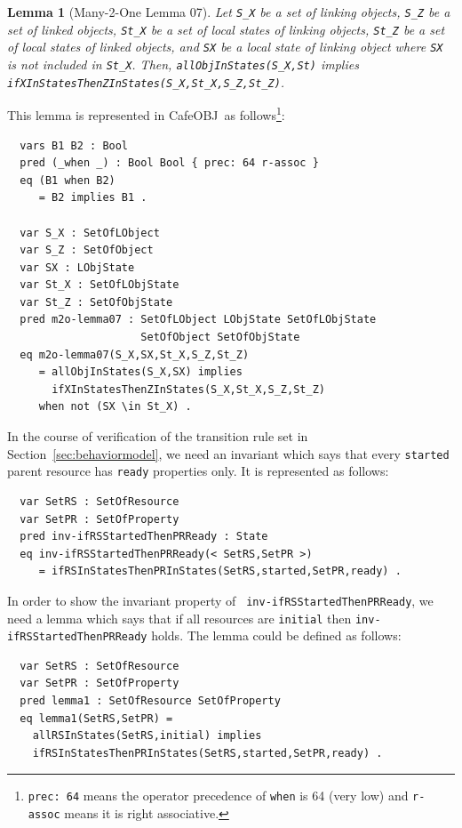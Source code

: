 \documentclass[12pt]{report}
\newtheorem{lemma}{Lemma}
\newcommand{\stt}[1]{{\small{\tt {#1}}}}
\newcommand{\cafeobj}{{\sf CafeOBJ}~}
\begin{document}
\begin{lemma}[Many-2-One Lemma 07]
  Let {\tt S\_X} be a set of linking objects, {\tt S\_Z} be a set of
  linked objects, {\tt St\_X} be a set of local states of linking
  objects, {\tt St\_Z} be a set of local states of linked objects, and
  {\tt SX} be a local state of linking object where {\tt SX} is not
  included in {\tt St\_X}. Then, \stt{allObjInStates(S\_X,St)} implies
  \stt{ifXInStatesThenZInStates(S\_X,St\_X,S\_Z,St\_Z)}.
\end{lemma}
This lemma is represented in \cafeobj as follows\footnote{\stt{prec:~64} 
means the operator precedence of {\tt when} is 64 (very low) and 
{\tt r-assoc} means it is right associative.}:
\small
\begin{verbatim}
  vars B1 B2 : Bool
  pred (_when _) : Bool Bool { prec: 64 r-assoc }
  eq (B1 when B2)
     = B2 implies B1 .

  var S_X : SetOfLObject
  var S_Z : SetOfObject
  var SX : LObjState
  var St_X : SetOfLObjState
  var St_Z : SetOfObjState
  pred m2o-lemma07 : SetOfLObject LObjState SetOfLObjState 
                     SetOfObject SetOfObjState
  eq m2o-lemma07(S_X,SX,St_X,S_Z,St_Z)
     = allObjInStates(S_X,SX) implies 
       ifXInStatesThenZInStates(S_X,St_X,S_Z,St_Z)
     when not (SX \in St_X) .
\end{verbatim}
\normalsize
In the course of verification of the transition rule set in
Section~\ref{sec:behaviormodel}, we need an invariant which says that
every {\tt started} parent resource has {\tt ready} properties
only. It is represented as follows:
\small
\begin{verbatim}
  var SetRS : SetOfResource
  var SetPR : SetOfProperty
  pred inv-ifRSStartedThenPRReady : State
  eq inv-ifRSStartedThenPRReady(< SetRS,SetPR >)
     = ifRSInStatesThenPRInStates(SetRS,started,SetPR,ready) .
\end{verbatim}
\normalsize
In order to show the invariant property of {\tt
  inv-ifRSStartedThenPRReady}, we need a lemma which says that if all
resources are {\tt initial} then {\tt inv-ifRSStartedThenPRReady}
holds.  The lemma could be defined as follows:
\small
\begin{verbatim}
  var SetRS : SetOfResource
  var SetPR : SetOfProperty
  pred lemma1 : SetOfResource SetOfProperty
  eq lemma1(SetRS,SetPR) =
    allRSInStates(SetRS,initial) implies
    ifRSInStatesThenPRInStates(SetRS,started,SetPR,ready) .
\end{verbatim}
\end{document}
